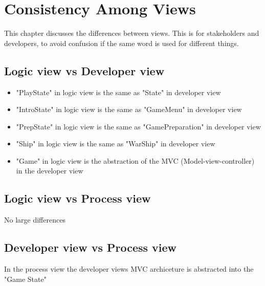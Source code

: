 \chapter{Consistency Among Views}
This chapter discusses the differences between views. This is for stakeholders and developers, to avoid confusion if the same word is used for different things.

\section{Logic view vs Developer view}
	\begin{itemize}
		\item "PlayState" in logic view is the same as "State" in developer view
		\item "IntroState" in logic view is the same as "GameMenu" in developer view
		\item "PrepState" in logic view is the same as "GamePreparation" in developer view
		\item "Ship" in logic view is the same as "WarShip" in developer view
		\item "Game" in logic view is the abstraction of the MVC (Model-view-controller) in the developer view
	\end{itemize}

\section{Logic view vs Process view}
No large differences

\section{Developer view vs Process view}
In the process view the developer views MVC archiceture is abstracted into the "Game State"